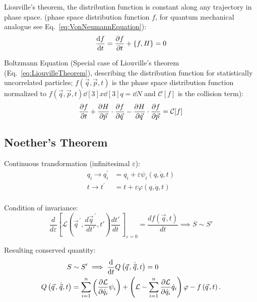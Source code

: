 		\noindent
		Liouville's theorem, \ie the distribution function is constant along any trajectory in phase space. (phase space distribution function $f$, for quantum mechanical analogue see Eq.~\ref{eq:VonNeumannEquation}):
		\begin{equation}
			\label{eq:LiouvilleTheorem}
			\dv{f}{t} = \pdv{f}{t} + \qty{f, H} = 0
		\end{equation}

		\noindent
		Boltzmann Equation (Special case of Liouville's theorem (Eq.~\ref{eq:LiouvilleTheorem}), describing the distribution function for statistically uncorrelated particles; $f(\vec{q},\vec{p},t)$ is the phase space distribution function normalized to $f(\vec{q},\vec{p},t)\dd[3]{x}\dd[3]{q} = \dd N$ and $\mathcal{C}[f]$ is the collision term):
		\begin{equation}
			\pdv{f}{t} + \pdv{H}{\vec{p}}\cdot\pdv{f}{\vec{q}} - \pdv{H}{\vec{q}}\cdot\pdv{f}{\vec{p}} = \mathcal{C}[f]
		\end{equation}

	\subsection{Noether's Theorem}
		\noindent
		Continuous transformation (infinitesimal $\varepsilon$):
		\begin{equation}
			\begin{aligned}
				q_i \to q_{i}^{\prime} &= q_i+\varepsilon\psi_i\left(q,\dot{q},t\right) \\
				t \to t^{\prime}\, &= t+\varepsilon\varphi\left(q,\dot{q},t\right) \\
			\end{aligned}
		\end{equation}

		\noindent
		Condition of invariance:
		\begin{equation}
			\frac{d}{d\varepsilon}\left[\mathcal{L}\left( {\vec{q}}^{\,\prime},\frac{d {\vec{q}}^{\,\prime}}{dt'},t'\right) \frac{dt'}{dt}\,\right]_{\varepsilon=0}=\frac{df(\vec{q}, t)}{dt} \implies S \sim S'
		\end{equation}

		\noindent
		Resulting conserved quantity:
		\begin{equation}
			\begin{aligned}
				S &\sim S' \implies
				\dv{t} Q\left(\vec{q},\dot{\vec{q}},t\right) = 0 \\
				Q\left(\vec{q},\dot{\vec{q}},t\right) &= \sum_{i=1}^{n}\left(\frac{\partial\mathcal{L}}{\partial{\dot{q}}_i}\psi_i\right)+\left(\mathcal{L}-\sum_{i=1}^{n}{\frac{\partial\mathcal{L}}{\partial{\dot{q}}_i}{\dot{q}}_i}\right)\varphi - f\left(\vec{q},t\right).
			\end{aligned}
		\end{equation}